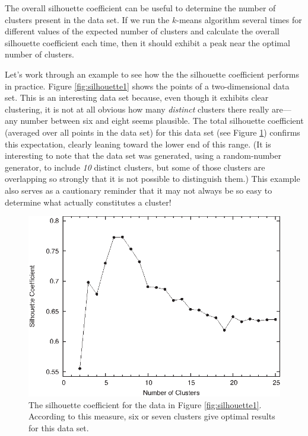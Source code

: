 The overall silhouette coefficient can be useful to determine the number
of clusters present in the data set. If we run the $k$-means\vadjust{\pagebreak} algorithm
several times for different values of the expected number of clusters
and calculate the overall silhouette coefficient each time, then it
should exhibit a peak near the optimal number of clusters.

Let's work through an example to see how the the silhouette
coefficient performs in practice.  Figure \ref{fig:silhouette1} shows
the points of a two-dimensional data set.  This is an interesting data
set because, even though it exhibits clear clustering, it is not at
all obvious how many \emph{distinct} clusters there really are---any
number between six and eight seems plausible.  The total silhouette
coefficient (averaged over all points in the data set) for this data
set (see Figure \ref{fig:silhouette2}) confirms this expectation,
clearly leaning toward the lower end of this range. (It is interesting
to note that the data set was generated, using a random-number
generator, to include \emph{10} distinct clusters, but some of those
clusters are overlapping so strongly that it is not possible to
distinguish them.) This example also serves as a cautionary reminder
that it may not always be so easy to determine what actually
constitutes a cluster!
      
\begin{figure}
  \centerline{\includegraphics{img/clustershop2}}
  \caption{The silhouette coefficient for the data in Figure
    \ref{fig:silhouette1}. According to this measure, six or seven
    clusters give optimal results for this data set.}
  \label{fig:silhouette2}\vspace*{-6pt}
\end{figure}

